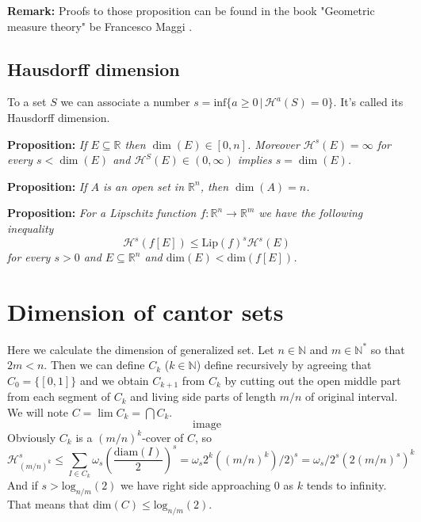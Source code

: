 \documentclass{article}
\begin{document}
\vspace{1ex}
\textbf{Remark:} Proofs to those proposition can be found in the book "Geometric
measure theory" be Francesco Maggi \cite{maggi}.
\subsection{Hausdorff dimension}

To a set $S$ we can associate a number $s=\text{inf}\{a\geq 0\,|\,\mathcal{H}^a
(S)=0\}$. It's called its Hausdorff dimension.

\vspace{2ex}
\textbf{Proposition:} \textit{If $E\subseteq\mathbb R$ then $\dim(E)\in [0, n]$.
Moreover $\mathcal H^s(E)=\infty$ for every $s<\dim(E)$ and $\mathcal H^S(E)\in
(0,\infty)$ implies $s=\dim(E)$.}

\vspace{2ex}
\textbf{Proposition:} \textit{If $A$ is an open set in $\mathbb R^n$, then $\dim
(A) = n$.}

\vspace{2ex}
\textbf{Proposition:} \textit{For a Lipschitz function $f:\mathbb{R}^n\rightarrow
\mathbb{R}^m$ we have the following inequality
\[ \mathcal{H}^s(f[E])\leq\text{Lip}(f)^s\mathcal{H}^s(E) \]
for every $s>0$ and $E\subseteq\mathbb{R}^n$ and $\text{dim}(E)<\text{dim}(f[E])$.}

\section{Dimension of cantor sets}
Here we calculate the dimension of generalized set. Let $n\in\mathbb{N}$ and
$m\in\mathbb{N}^*$ so that $2m<n$. Then we can define $C_k$ ($k\in\mathbb{N}$)
define recursively by agreeing that $C_0=\{[0,1]\}$ and we obtain $C_{k+1}$ from $C_k$
by cutting out the open middle part from each segment of $C_k$ and living side parts
of length $m/n$ of original interval. We will note $C=\lim C_k=\bigcap C_k$.
\[\text{image}\]
Obviously $C_k$ is a $(m/n)^k$-cover of $C$, so
\[ \mathcal{H}_{(m/n)^k}^s \leq \sum_{I\in C_k}\omega_s(\frac{\text{diam}(I)}{2})^s
=\omega_s2^k((m/n)^k)/2)^s=\omega_s/2^s(2(m/n)^s)^k \]
And if $s>\text{log}_{n/m}(2)$ we have right side approaching 0 as $k$ tends to
infinity. That means that $\text{dim}(C)\leq\text{log}_{n/m}(2)$.
\end{document}
